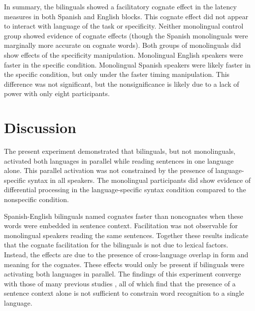In summary, the bilinguals showed a facilitatory cognate effect in the latency measures in both Spanish and English blocks. This cognate effect did not appear to interact with language of the task or specificity. Neither monolingual control group showed evidence of cognate effects (though the Spanish monolinguals were marginally more accurate on cognate words). Both groups of monolinguals did show effects of the specificity manipulation. Monolingual English speakers were faster in the specific condition. Monolingual Spanish speakers were likely faster in the specific condition, but only under the faster timing manipulation. This difference was not significant, but the nonsignificance is likely due to a lack of power with only eight participants. 

\section{Discussion}
The present experiment demonstrated that bilinguals, but not monolinguals, activated both languages in parallel while reading sentences in one language alone. This parallel activation was not constrained by the presence of language-specific syntax in all speakers. The monolingual participants did show evidence of differential processing in the language-specific syntax condition compared to the nonspecific condition. 


Spanish-English bilinguals named cognates faster than noncognates when these words were embedded in sentence context. Facilitation was not observable for monolingual speakers reading the same sentences. Together these results indicate that the cognate facilitation for the bilinguals is not due to lexical factors. Instead, the effects are due to the presence of cross-language overlap in form and meaning for the cognates. These  effects would only be present if bilinguals were activating both languages in parallel. The findings of this experiment converge with those of many previous studies \parencite[e.g.,][]{Baten2010,Chambers2009, Duyck2007, Libben2009, Schwartz2006, VanAssche2009, VanAssche2010, VanHell2008}, all of which find that the presence of a sentence context alone is not sufficient to constrain word recognition to a single language.

